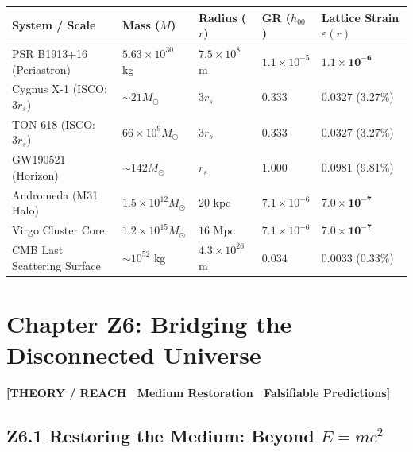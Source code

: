 \documentclass[11pt, letterpaper, openany]{book}
\begin{document}
\begin{center}
\renewcommand{\arraystretch}{1.2}
\small
\begin{tabular}{|p{3.8cm}|p{2.1cm}|p{2.2cm}|p{1.9cm}|p{2.5cm}|}
\hline
\rowcolor{kishblue!12}
\textbf{System / Scale} & \textbf{Mass ($M$)} & \textbf{Radius ($r$)} & \textbf{GR ($h_{00}$)} & \textbf{Lattice Strain $\varepsilon(r)$} \\
\hline
PSR B1913+16 (Periastron) & $5.63 \times 10^{30}$ kg & $7.5 \times 10^8$ m & $1.1 \times 10^{-5}$ & $\mathbf{1.1 \times 10^{-6}}$ \\
\hline
Cygnus X-1 (ISCO: $3 r_s$) & $\sim 21 M_\odot$ & $3 r_s$ & $0.333$ & $\mathbf{0.0327}$ (3.27\%) \\
\hline
TON 618 (ISCO: $3 r_s$) & $66 \times 10^9 M_\odot$ & $3 r_s$ & $0.333$ & $\mathbf{0.0327}$ (3.27\%) \\
\hline
GW190521 (Horizon) & $\sim 142 M_\odot$ & $r_s$ & $1.000$ & $\mathbf{0.0981}$ (9.81\%) \\
\hline
Andromeda (M31 Halo) & $1.5 \times 10^{12} M_\odot$ & $20$ kpc & $7.1 \times 10^{-6}$ & $\mathbf{7.0 \times 10^{-7}}$ \\
\hline
Virgo Cluster Core & $1.2 \times 10^{15} M_\odot$ & $16$ Mpc & $7.1 \times 10^{-6}$ & $\mathbf{7.0 \times 10^{-7}}$ \\
\hline
CMB Last Scattering Surface & $\sim 10^{52}$ kg & $4.3 \times 10^{26}$ m & $0.034$ & $\mathbf{0.0033}$ (0.33\%) \\
\hline
\end{tabular}
\end{center}

\vspace{1cm}
\section*{Chapter Z6: Bridging the Disconnected Universe}

\begin{center}
{\color{theorytag}\textbf{[THEORY / REACH \textbullet\ Medium Restoration \textbullet\ Falsifiable Predictions]}}
\end{center}

\subsection*{Z6.1 Restoring the Medium: Beyond $E=mc^2$}
\end{document}
